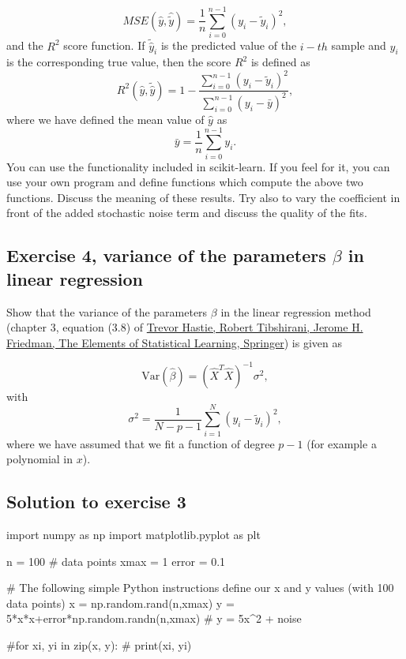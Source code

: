 \documentclass[%
oneside,                 %
final,                   %
10pt]{article}
\begin{document}
\noindent
\[ MSE(\hat{y},\hat{\tilde{y}}) = \frac{1}{n}
\sum_{i=0}^{n-1}(y_i-\tilde{y}_i)^2, 
\] 
and the $R^2$ score function.
If $\tilde{\hat{y}}_i$ is the predicted value of the $i-th$ sample and $y_i$ is the corresponding true value, then the score $R^2$ is defined as
\[
R^2(\hat{y}, \tilde{\hat{y}}) = 1 - \frac{\sum_{i=0}^{n - 1} (y_i - \tilde{y}_i)^2}{\sum_{i=0}^{n - 1} (y_i - \bar{y})^2},
\]
where we have defined the mean value  of $\hat{y}$ as
\[
\bar{y} =  \frac{1}{n} \sum_{i=0}^{n - 1} y_i.
\]
You can use the functionality included in scikit-learn. If you feel for it, you can use your own program and define functions which compute the above two functions. 
Discuss the meaning of these results. Try also to vary the coefficient in front of the added stochastic noise term and discuss the quality of the fits.




\subsection*{Exercise 4, variance of the parameters $\beta$ in linear regression}

Show that the variance of the parameters $\beta$ in the linear regression method (chapter 3, equation (3.8) of \href{{https://www.springer.com/gp/book/9780387848570}}{Trevor Hastie, Robert Tibshirani, Jerome H. Friedman, The Elements of Statistical Learning, Springer}) is given as 

\[
\mathrm{Var}(\hat{\beta}) = \left(\hat{X}^T\hat{X}\right)^{-1}\sigma^2,
\]
with 
\[
\sigma^2 = \frac{1}{N-p-1}\sum_{i=1}^{N} (y_i-\tilde{y}_i)^2,
\]
where we have assumed that we fit a function of degree $p-1$ (for example a polynomial in $x$). 

\subsection*{Solution to exercise 3}


\begin{print}
import numpy as np
import matplotlib.pyplot as plt

n = 100 # data points
xmax = 1
error = 0.1

# The following simple Python instructions define our x and y values (with 100 data points)
x = np.random.rand(n,xmax)
y = 5*x*x+error*np.random.randn(n,xmax) # y = 5x^2 + noise

#for xi, yi in zip(x, y):
#    print(xi, yi)
\end{print}
\end{document}
